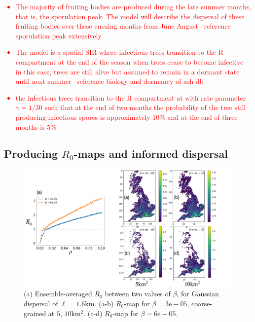 \textcolor{red}{
\begin{itemize}
    \item The majority of fruiting bodies are produced during the late summer months, that is, the sporulation peak. The model will describe the dispersal of these fruiting bodies over these ensuing months from June-August --reference sporulation peak extensively
    \item The model is a spatial SIR where infectious trees transition to the R compartment at the end of the season when trees cease to become infective -- in this case, trees are still alive but assumed to remain in a dormant state until next summer --reference biology and dormancy of ash db
    \item the infectious trees transition to the R compartment at with rate parameter $\gamma = 1/30$ such that at the end of two months the probability of the tree still producing infectious spores is approximately $10\%$ and at the end of three months is $5\%$
\end{itemize}
}


\subsection{Producing $R_0$-maps and informed dispersal}

\begin{figure}
    \centering
    \includegraphics[scale=0.25]{chapter5/figures_/fig3.pdf}
      \caption{(a) Ensemble-averaged $R_0$ between two values of $\beta$, for Gaussian dispersal of $\ell=1.6\mathrm{km}$. (a-b) $R_0$-map for $\beta=3\mathrm{e}-05$, coarse-grained at $5$, $ 10\mathrm{km^2}$. (c-d) $R_0$-map for $\beta=6\mathrm{e}-05$.}
    \label{fig:mapping-R0-onto-density}
\end{figure}

